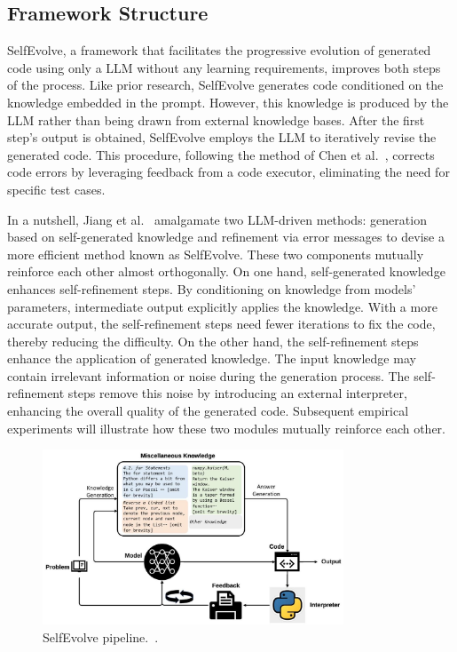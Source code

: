 \documentclass[a4paper,oneside]{book}
\begin{document}
\subsection{Framework Structure}
SelfEvolve, a framework that facilitates the progressive evolution of generated code using only a LLM without any learning requirements, improves both steps of the process. Like prior research, SelfEvolve generates code conditioned on the knowledge embedded in the prompt. However, this knowledge is produced by the LLM rather than being drawn from external knowledge bases. After the first step's output is obtained, SelfEvolve employs the LLM to iteratively revise the generated code. This procedure, following the method of Chen et al.~\cite{chen2023teaching}, corrects code errors by leveraging feedback from a code executor, eliminating the need for specific test cases.

In a nutshell, Jiang et al.~\cite{jiang2023selfevolve} amalgamate two LLM-driven methods: generation based on self-generated knowledge and refinement via error messages to devise a more efficient method known as SelfEvolve. These two components mutually reinforce each other almost orthogonally. On one hand, self-generated knowledge enhances self-refinement steps. By conditioning on knowledge from models' parameters, intermediate output explicitly applies the knowledge. With a more accurate output, the self-refinement steps need fewer iterations to fix the code, thereby reducing the difficulty. On the other hand, the self-refinement steps enhance the application of generated knowledge. The input knowledge may contain irrelevant information or noise during the generation process. The self-refinement steps remove this noise by introducing an external interpreter, enhancing the overall quality of the generated code. Subsequent empirical experiments will illustrate how these two modules mutually reinforce each other.

\begin{figure}[!htb]
  \centering
  \includegraphics[width=0.8\textwidth]{img/selfevolve}
  \caption{SelfEvolve pipeline.~\cite{jiang2023selfevolve}.}\label{fig:selfevolve}
\end{figure}
\end{document}
